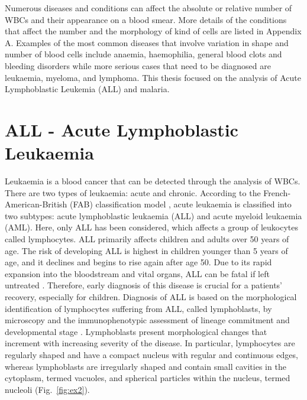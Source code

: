\documentclass[final,a4paper,12pt,english]{UnicaPhdThesis3}
\begin{document}
Numerous diseases and conditions can affect the absolute or relative number of WBCs and their appearance on a blood smear. More details of the conditions that affect the number and the morphology of kind of cells are listed in Appendix A. Examples of the most common diseases that involve variation in shape and number of blood cells include anaemia, haemophilia, general blood clots and bleeding disorders while more serious cases that need to be diagnosed are leukaemia, myeloma, and lymphoma. This thesis focused on the analysis of Acute Lymphoblastic Leukemia (ALL) and malaria.

\section{ALL - Acute Lymphoblastic Leukaemia}
Leukaemia is a blood cancer that can be detected through the analysis of WBCs. There are two types of leukaemia: acute and chronic. According to the French-American-British (FAB) classification model \cite{Bennett}, acute leukaemia is classified into two subtypes: acute lymphoblastic leukaemia (\acs{ALL}) and acute myeloid leukaemia (AML). Here, only ALL has been considered, which affects a group of leukocytes called lymphocytes. ALL primarily affects children and adults over 50 years of age. The risk of developing ALL is highest in children younger than 5 years of age, and it declines and begins to rise again after age 50. Due to its rapid expansion into the bloodstream and vital organs, ALL can be fatal if left untreated \cite{Biondi}. Therefore, early diagnosis of this disease is crucial for a patients' recovery, especially for children. Diagnosis of ALL is based on the morphological identification of lymphocytes suffering from ALL, called lymphoblasts, by microscopy and the immunophenotypic assessment of lineage commitment and developmental stage \cite{Inaba}. Lymphoblasts present morphological changes that increment with increasing severity of the disease. In particular, lymphocytes are regularly shaped and have a compact nucleus with regular and continuous edges, whereas lymphoblasts are irregularly shaped and contain small cavities in the cytoplasm, termed vacuoles, and spherical particles within the nucleus, termed nucleoli \cite{Donida} (Fig.~\ref{fig:ex2}).
\end{document}
